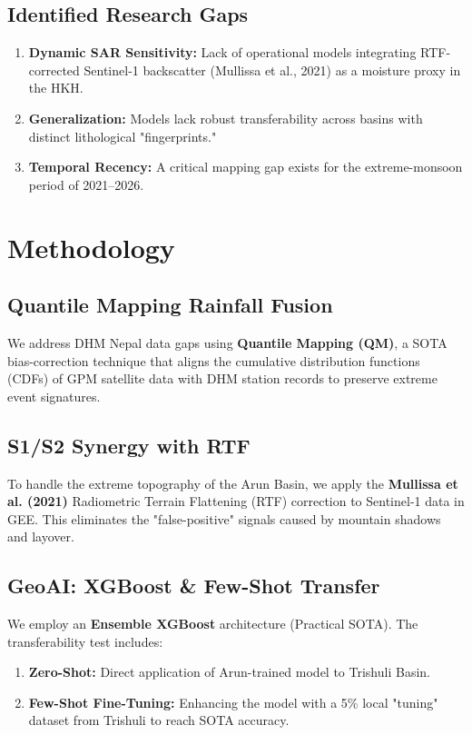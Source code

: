 \documentclass[12pt,a4paper]{article}
\begin{document}
\subsection{Identified Research Gaps}
\begin{enumerate}
    \item \textbf{Dynamic SAR Sensitivity:} Lack of operational models integrating RTF-corrected Sentinel-1 backscatter (Mullissa et al., 2021) as a moisture proxy in the HKH.
    \item \textbf{Generalization:} Models lack robust transferability across basins with distinct lithological "fingerprints."
    \item \textbf{Temporal Recency:} A critical mapping gap exists for the extreme-monsoon period of 2021--2026.
\end{enumerate}

\section{Methodology}
\subsection{Quantile Mapping Rainfall Fusion}
We address DHM Nepal data gaps using \textbf{Quantile Mapping (QM)}, a SOTA bias-correction technique that aligns the cumulative distribution functions (CDFs) of GPM satellite data with DHM station records to preserve extreme event signatures.

\subsection{S1/S2 Synergy with RTF}
To handle the extreme topography of the Arun Basin, we apply the \textbf{Mullissa et al. (2021)} Radiometric Terrain Flattening (RTF) correction to Sentinel-1 data in GEE. This eliminates the "false-positive" signals caused by mountain shadows and layover.

\subsection{GeoAI: XGBoost \& Few-Shot Transfer}
We employ an \textbf{Ensemble XGBoost} architecture (Practical SOTA). The transferability test includes:
\begin{enumerate}
    \item \textbf{Zero-Shot:} Direct application of Arun-trained model to Trishuli Basin.
    \item \textbf{Few-Shot Fine-Tuning:} Enhancing the model with a 5\% local "tuning" dataset from Trishuli to reach SOTA accuracy.
\end{enumerate}
\end{document}
